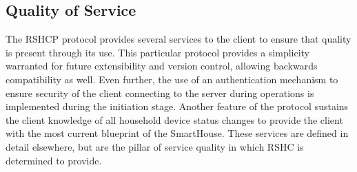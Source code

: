 \subsection{Quality of Service}
\label{sec:pdus:qos}

The RSHCP protocol provides several services to the client to ensure that quality is present through its use. This particular protocol provides a simplicity warranted for future extensibility and version control, allowing backwards compatibility as well. Even further, the use of an authentication mechanism to ensure security of the client connecting to the server during operations is implemented during the initiation stage. Another feature of the protocol sustains the client knowledge of all household device status changes to provide the client with the most current blueprint of the SmartHouse.  These services are defined in detail elsewhere, but are the pillar of service quality in which RSHC is determined to provide. 